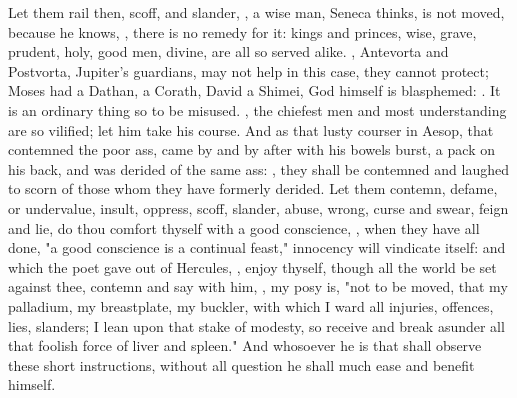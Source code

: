 {Let them rail then, scoff, and slander, , a wise man, Seneca thinks, is not moved, because he knows, , there is no remedy for it: kings and princes, wise, grave, prudent, holy, good men, divine, are all so served alike. , Antevorta and Postvorta, Jupiter's guardians, may not help in this case, they cannot protect; Moses had a Dathan, a Corath, David a Shimei, God himself is blasphemed: . It is an ordinary thing so to be misused. , the chiefest men and most understanding are so vilified; let him take his course. And as that lusty courser in Aesop, that contemned the poor ass, came by and by after with his bowels burst, a pack on his back, and was derided of the same ass: , they shall be contemned and laughed to scorn of those whom they have formerly derided. Let them contemn, defame, or undervalue, insult, oppress, scoff, slander, abuse, wrong, curse and swear, feign and lie, do thou comfort thyself with a good conscience, , when they have all done, "a good conscience is a continual feast," innocency will vindicate itself: and which the poet gave out of Hercules, , enjoy thyself, though all the world be set against thee, contemn and say with him, , my posy is, "not to be moved, that my palladium, my breastplate, my buckler, with which I ward all injuries, offences, lies, slanders; I lean upon that stake of modesty, so receive and break asunder all that foolish force of liver and spleen." And whosoever he is that shall observe these short instructions, without all question he shall much ease and benefit himself.

}
